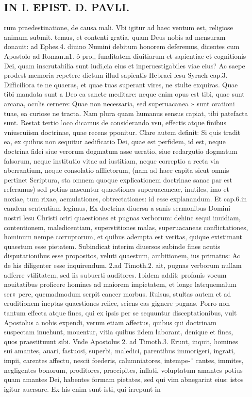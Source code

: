 \documentclass{article}
\begin{document}
\begin{pages}
\section*{IN I. EPIST. D. PAVLI. }
\marginpar{[ p.19 ]}\pstart rum praedestinatione, de causa mali. Vbi igitur ad haec ventum est, religiose animum submit. temus, et contenti gratia, quam Deus nobis ad mensuram donauit: ad Ephes.4. diuino Numini debitum honorem deferemus, dicentes cum Apostolo ad Roman.n1. ô pro,, funditatem diuitiarum et sapientiae et cognitionis Dei, quam inscrutabilia sunt iudi,cia eius et inperuestigabiles viae eius? Ac saepe prodest memoria repetere dictum illud sapientis Hebraei lesu Syrach cap.3. Difficiliora te ne quaeras, et quae tuas superant   vires, ne stulte exquiras. Quae tibi mandata sunt a Deo ea sancte meditare: neque  enim   opus est tibi, quae sunt arcana, oculis cernere: Quae non necessaria, sed superuacanea » sunt orationi tuae, ea curiose ne tracta. Nam plura quam humanus sensus capiat, tibi   patefacta sunt.  \pend\pstart Restat tertio loco dicamus de considerando vsu, effectis atque  finibus vniuscuiism doctrinae, quae recens pponitur. Clare autem definit: Si quis tradit ea, ex quibus non sequitur aedificatio Dei, quae est perfidem, id est, neque  doctrina fidei siue verorum dogmatum asse ueratio, siue redargutio dogmatum falsorum, neque  institutio vitae ad iustitiam, neque  correptio a recta via aberrantium, neque  consolatio afflictorum, (nam ad haec capita sicut omnis pertinet Scriptura, sta omnem quoque  explicationem doctrinae sanae par est referamus) sed potius nascuntur quaestiones superuacaneae, inutiles, imo et noxiae, tum rixae, aemulationes, obtrectationes: id esse explanandum. Et cap.6.in eandem sententiam legimus, Ex doctrina diuersa a sanis sermonibus Domini nostri lesu Christi oriri quaestiones et pugnas verborum: dehinc sequi inuidiam, contentionem, maledicentiam, superstitiones malas, superuacaneas conflictationes, hominum nempe corruptorum, et quibus adempta est veritas, quique  existimant quaestum esse pietatem. Subindicat interim diuersos subinde fines acutis disputationibus esse propositos, veluti quaestum, ambitionem, ius primatus: Ac de his diligenter esse inquirendum. 2.ad Timoth.2. ait, pugnas verborum nullam adferre vtilitatem, sed iis subuerti auditores. Ibidem addit: profanis vocum nouitatibus proficere homines ad maiorem impietatem, et longe latequemalum ser» pere, quemadmodum serpit cancer morbus. Ruisus, stultas autem et ad eruditionem ineptas quaestiones reiice, sciens eas gignere pugnas. Porro non tantum effecta atque  fines, qui ex ipsis per se sequuntur disceptationibus, vult Apostolus a nobis expendi, verum etiam affectus, quibus qui doctrinam suspectam inuehunt, mouentur, vitia quibus iidem laborant, denique  et fines, quos praestituunt sibi. Vnde Apostolus 2. ad Timoth.3. Erunt, inquit, homines sui amantes, auari, fastuosi, superbi, maledici, parentibus   immorigeri, ingrati, impii, carentes affectu, nescii foederis, calumniatores, intempe-¨   rantes, immites, negligentes bonorum, proditores, praecipites, inflati, voluptatum amantes potius quam amantes Dei, habentes formam pietates, sed qui vim abnegarint   eius: istos igitur auersare. Ex his enim sunt isti, qui irrepunt in 
\end{pages}
\end{document}
